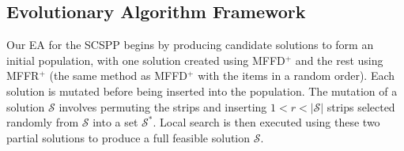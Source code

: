 \documentclass{elsarticle}
\begin{document}
\begin{comment}
{\color{myRed}
\begin{itemize}[leftmargin=*]
	\item
	\idone{Purpose of local search, takes two partial solutions $\mathcal{S}_X$ and $\mathcal{S}_Y$.}
	\idone{Initially permute strips.}
	\idone{4 stages, 3 swap, 1 move. width of items from $\mathcal{S}_X$ must be less than width of items from $\mathcal{S}_Y$ in first three stages.}
	\idone{Moves smaller items into $\mathcal{S}_Y$, larger items into $\mathcal{S}_X$.}
	\idone{If swap/move performed, move onto next stage. Repeat until no changes to either partial solution.}
	\idone{MFFD$^+$ applied on items in $\mathcal{S}_Y$ to produce partial solution $\mathcal{S}_Y'$. Then strips from $\mathcal{S}_X$ and $\mathcal{S}_Y'$ inserted into $\mathcal{S}$ (this is not necessarily offspring).}
	\idone{Based on dominance criterion of Martello and Toth \cite{martello1990l}.}
	\idone{If strip $S_1$ dominates $S_2$, the a solution using $S_1$ will have no more strips than a solution using $S_2$.}
	\idone{Aim - increase fullness of strips in $\mathcal{S}_X$ while maintaining or decreasing number of items on strips.}
	\idone{Moves smaller items into $\mathcal{S}_Y$, easier to repack in stage (4).}
	\idone{Variations of procedure seen in Falkenauer \cite{falkenauer1996}, Lewis \cite{lewis2009} \cite{lewis2017}, Levine \cite{levine2004}.}
	\idone{VSC makes swaps/moves more difficult, this means local search takes longer, fewer swaps than seen in \cite{lewis2009}, \cite{lewis2017}, \cite{levine2004}, \cite{falkenauer1996} (check).}
	\idone{Repeating process produces different combinations of items, more possibilities to find feasible ordering.}
	\idone{Well-filled strips with larger items preferable over less-filled strips with smaller items (Levine \cite{levine2004}).}
\end{itemize}
}
\end{comment}

\subsection{Evolutionary Algorithm Framework}
\label{sub:eaframework}
\noindent Our EA for the SCSPP begins by producing candidate solutions to form an initial population, with one solution created using MFFD$^+$ and the rest using MFFR$^+$ (the same method as MFFD$^+$ with the items in a random order). Each solution is mutated before being inserted into the population. The mutation of a solution $\mathcal{S}$ involves permuting the strips and inserting $1 < r < |\mathcal{S}|$ strips selected randomly from $\mathcal{S}$ into a set $\mathcal{S}^*$. Local search is then executed using these two partial solutions to produce a full feasible solution $\mathcal{S}$. 
\end{document}
